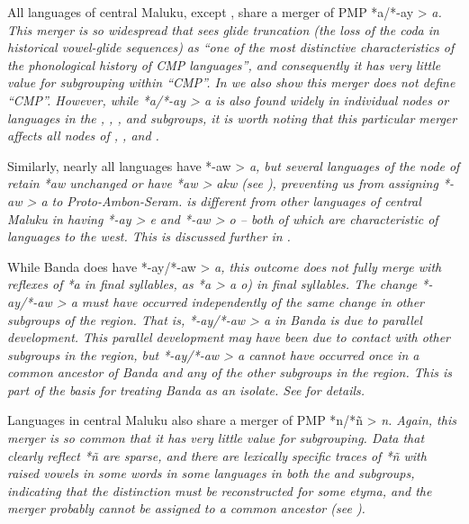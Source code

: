 All languages of central Maluku,
except , share a merger of PMP *a/*-ay > \it{a}.
This merger is so widespread that \citet[264]{Blust1993} sees
glide truncation (the loss of the coda in historical vowel-glide
sequences) as “one of the most distinctive characteristics of
the phonological history of CMP languages”,
and consequently it has very little value for subgrouping within “CMP”.
In  we also show this merger does not define “CMP”.
However, while *a/*-ay > \it{a} is also found widely in individual
nodes or languages in the ,
, , and 
subgroups, it is worth noting that this particular merger affects
all nodes of , , and .

Similarly, nearly all languages have *-aw > \it{a},
but several languages of the  node of 
retain *aw unchanged or have *aw > \it{akw} (see ),
preventing us from assigning *-aw > \it{a} to Proto-Ambon-Seram.
 is different from other languages of central Maluku
in having *-ay > \it{e}
and *-aw > \it{o} -- both of which are characteristic of 
languages to the west.
This is discussed further in .

While Banda does have *-ay/*-aw > \it{a},
this outcome does not fully merge with reflexes of *a in final
syllables, as *a > \it{a {\tl} o}) in final syllables.
The change \mbox{*-ay/*-aw} > \it{a} must have occurred independently
of the same change in other subgroups of the region.
That is, *-ay/*-aw > \it{a} in Banda is due to parallel development.
This parallel development may have been due to contact with other
subgroups in the region,
but *-ay/*-aw > \it{a} cannot have occurred once in a common
ancestor of Banda and any of the other subgroups in the region.
This is part of the basis for treating Banda as an isolate.
See  for details.

Languages in central Maluku also share a merger of PMP *n/*ñ > \it{n}.
Again, this merger is so common that it has very little value for subgrouping.
Data that clearly reflect *ñ are sparse,
and there are lexically specific traces of *ñ with raised vowels
in some words in some languages in both the 
and  subgroups, indicating that the distinction
must be reconstructed for some etyma, and the merger probably
cannot be assigned to a common ancestor (see ).

